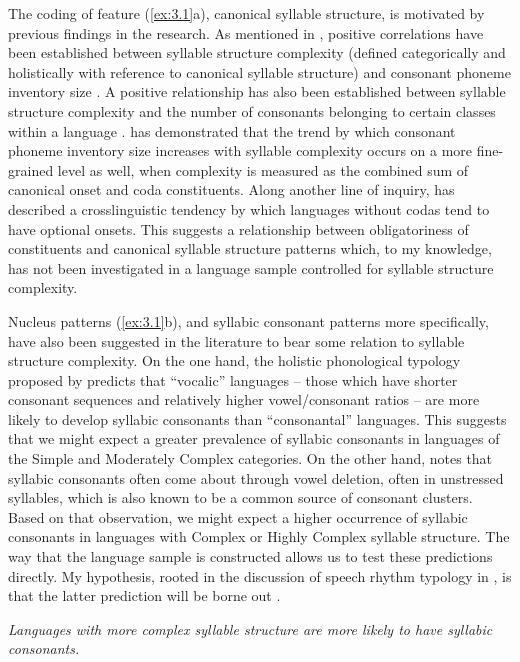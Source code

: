   The coding of feature (\ref{ex:3.1}a), canonical syllable structure, is motivated by previous findings in the research. As mentioned in , positive correlations have been established between syllable structure complexity (defined categorically and holistically with reference to canonical syllable structure) and consonant phoneme inventory size \citep{Maddieson2013a}. A positive relationship has also been established between syllable structure complexity and the number of consonants belonging to certain classes within a language \citep{MaddiesonEtAl2013}. \citet{Gordon2016} has demonstrated that the trend by which consonant phoneme inventory size increases with syllable complexity occurs on a more fine-grained level as well, when complexity is measured as the combined sum of canonical onset and coda constituents. Along another line of inquiry, \citet[336]{Blevins2006} has described a crosslinguistic tendency by which languages without codas tend to have optional onsets. This suggests a relationship between obligatoriness of constituents and canonical syllable structure patterns which, to my knowledge, has not been investigated in a language sample controlled for syllable structure complexity.

  Nucleus patterns (\ref{ex:3.1}b), and syllabic consonant patterns more specifically, have also been suggested in the literature to bear some relation to syllable structure complexity. On the one hand, the holistic phonological typology proposed by \citet{Isačenko1939/1940} predicts that ``vocalic'' languages -- those which have shorter consonant sequences and relatively higher vowel/consonant ratios -- are more likely to develop syllabic consonants than ``consonantal'' languages. This suggests that we might expect a greater prevalence of syllabic consonants in languages of the Simple and Moderately Complex categories. On the other hand, \citet{Bell1978a} notes that syllabic consonants often come about through vowel deletion, often in unstressed syllables, which is also known to be a common source of consonant clusters. Based on that observation, we might expect a higher occurrence of syllabic consonants in languages with Complex or Highly Complex syllable structure. The way that the language sample is constructed allows us to test these predictions directly. My hypothesis, rooted in the discussion of speech rhythm typology in , is that the latter prediction will be borne out .

\ea\label{ex:3.3}
   \textit{Languages with more complex syllable structure are more likely to have syllabic consonants.}
\z

